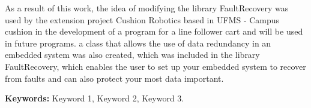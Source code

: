 {As a result of this work, the idea of modifying the library FaultRecovery was used by the extension project Cushion Robotics based in UFMS - Campus cushion in the development of a program for a line follower cart and will be used in future programs. a class that allows the use of data redundancy in an embedded system was also created, which was included in the library FaultRecovery, which enables the user to set up your embedded system to recover from faults and can also protect your most data important.

\textbf{Keywords:} Keyword 1, Keyword 2, Keyword 3.

}